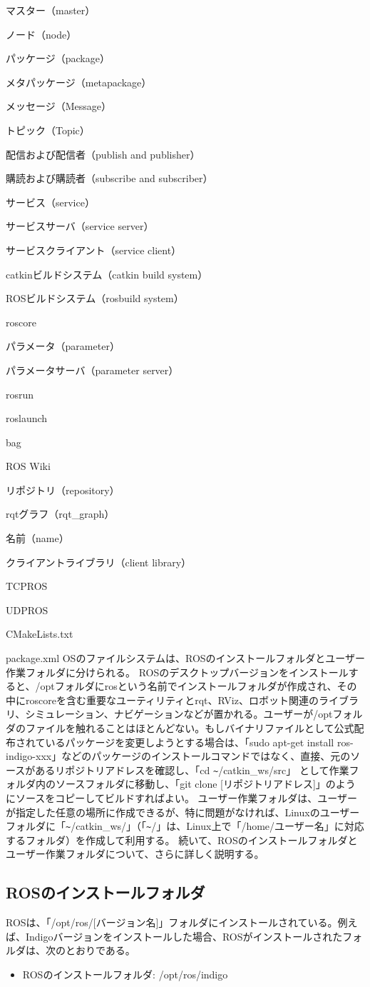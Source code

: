 \begin{term}{マスター（master）}
\begin{term}{ノード（node）}
\begin{term}{パッケージ（package）}
\begin{term}{メタパッケージ（metapackage）}
\begin{term}{メッセージ（Message）}
\begin{term}{トピック（Topic）}
\begin{term}{配信および配信者（publish and publisher）}
\begin{term}{購読および購読者（subscribe and subscriber）}
\begin{term}{サービス（service）}
\begin{term}{サービスサーバ（service server）}
\begin{term}{サービスクライアント（service client）}
\begin{term}{catkinビルドシステム（catkin build system）}
\begin{term}{ROSビルドシステム（rosbuild system）}
\begin{term}{roscore}
\begin{term}{パラメータ（parameter）}
\begin{term}{パラメータサーバ（parameter server）}
\begin{term}{rosrun}
\begin{term}{roslaunch}
\begin{term}{bag}
\begin{term}{ROS Wiki}
\begin{term}{リポジトリ（repository）}
\begin{term}{rqtグラフ（rqt\_graph）}
\begin{term}{名前（name）}
\begin{term}{クライアントライブラリ（client library）}
\begin{term}{TCPROS}
\begin{term}{UDPROS}
\begin{term}{CMakeLists.txt}
\begin{term}{package.xml}
OSのファイルシステムは、ROSのインストールフォルダとユーザー作業フォルダに分けられる。
ROSのデスクトップバージョンをインストールすると、/optフォルダにrosという名前でインストールフォルダが作成され、その中にroscoreを含む重要なユーティリティとrqt、RViz、ロボット関連のライブラリ、シミュレーション、ナビゲーションなどが置かれる。ユーザーが/optフォルダのファイルを触れることはほとんどない。もしバイナリファイルとして公式配布されているパッケージを変更しようとする場合は、「sudo apt-get install ros-indigo-xxx」などのパッケージのインストールコマンドではなく、直接、元のソースがあるリポジトリアドレスを確認し、「cd \verb|~|/catkin\_ws/src」 として作業フォルダ内のソースフォルダに移動し、「git clone [リポジトリアドレス]」のようにソースをコピーしてビルドすればよい。
ユーザー作業フォルダは、ユーザーが指定した任意の場所に作成できるが、特に問題がなければ、Linuxのユーザーフォルダに「\verb|~|/catkin\_ws/」（「\verb|~|/」は、Linux上で「/home/ユーザー名」に対応するフォルダ）を作成して利用する。
続いて、ROSのインストールフォルダとユーザー作業フォルダについて、さらに詳しく説明する。

\subsection{ROSのインストールフォルダ}

ROSは、「/opt/ros/[バージョン名]」フォルダにインストールされている。例えば、Indigoバージョンをインストールした場合、ROSがインストールされたフォルダは、次のとおりである。

\vspace{\baselineskip}
\begin{itemize}
\item ROSのインストールフォルダ: /opt/ros/indigo
\end{itemize}
\vspace{\baselineskip}


\end{term}
\end{term}
\end{term}
\end{term}
\end{term}
\end{term}
\end{term}
\end{term}
\end{term}
\end{term}
\end{term}
\end{term}
\end{term}
\end{term}
\end{term}
\end{term}
\end{term}
\end{term}
\end{term}
\end{term}
\end{term}
\end{term}
\end{term}
\end{term}
\end{term}
\end{term}
\end{term}
\end{term}
